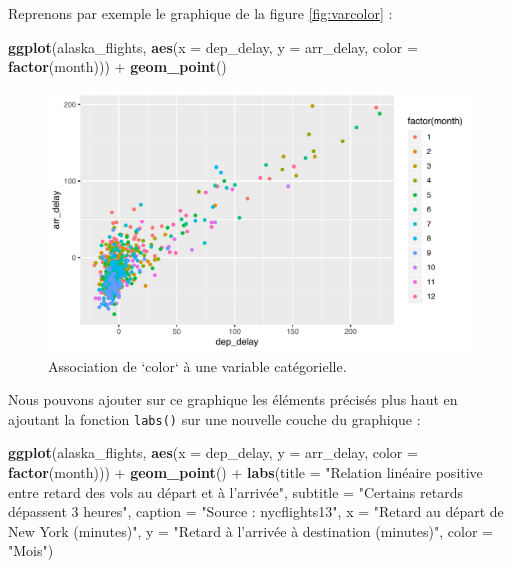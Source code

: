 \documentclass[
  a4paper,
]{article}
\newenvironment{Shaded}{\begin{snugshade}}{\end{snugshade}}
\newcommand{\DataTypeTok}[1]{\textcolor[rgb]{0.00,0.34,0.68}{#1}}
\newcommand{\KeywordTok}[1]{\textcolor[rgb]{0.12,0.11,0.11}{\textbf{#1}}}
\newcommand{\NormalTok}[1]{\textcolor[rgb]{0.12,0.11,0.11}{#1}}
\newcommand{\OperatorTok}[1]{\textcolor[rgb]{0.12,0.11,0.11}{#1}}
\newcommand{\StringTok}[1]{\textcolor[rgb]{0.75,0.01,0.01}{#1}}
\begin{document}
Reprenons par exemple le graphique de la figure \ref{fig:varcolor} :

\begin{Shaded}
\begin{Highlighting}[]
\KeywordTok{ggplot}\NormalTok{(alaska_flights, }
       \KeywordTok{aes}\NormalTok{(}\DataTypeTok{x =}\NormalTok{ dep_delay, }\DataTypeTok{y =}\NormalTok{ arr_delay, }\DataTypeTok{color =} \KeywordTok{factor}\NormalTok{(month))) }\OperatorTok{+}
\StringTok{  }\KeywordTok{geom_point}\NormalTok{()}
\end{Highlighting}
\end{Shaded}

\begin{figure}[htpb]

{\centering \includegraphics[width=0.9\linewidth]{figure/varcolorlabel-1} 

}

\caption{Association de `color` à une variable catégorielle.}\label{fig:varcolorlabel}
\end{figure}

Nous pouvons ajouter sur ce graphique les éléments précisés plus haut en ajoutant la fonction \texttt{labs()} sur une nouvelle couche du graphique :

\begin{Shaded}
\begin{Highlighting}[]
\KeywordTok{ggplot}\NormalTok{(alaska_flights, }
       \KeywordTok{aes}\NormalTok{(}\DataTypeTok{x =}\NormalTok{ dep_delay, }\DataTypeTok{y =}\NormalTok{ arr_delay, }\DataTypeTok{color =} \KeywordTok{factor}\NormalTok{(month))) }\OperatorTok{+}
\StringTok{  }\KeywordTok{geom_point}\NormalTok{() }\OperatorTok{+}
\StringTok{  }\KeywordTok{labs}\NormalTok{(}\DataTypeTok{title =} \StringTok{"Relation linéaire positive entre retard des vols au départ et à l'arrivée"}\NormalTok{,}
       \DataTypeTok{subtitle =} \StringTok{"Certains retards dépassent 3 heures"}\NormalTok{,}
       \DataTypeTok{caption =} \StringTok{"Source : nycflights13"}\NormalTok{,}
       \DataTypeTok{x =} \StringTok{"Retard au départ de New York (minutes)"}\NormalTok{,}
       \DataTypeTok{y =} \StringTok{"Retard à l'arrivée à destination (minutes)"}\NormalTok{,}
       \DataTypeTok{color =} \StringTok{"Mois"}\NormalTok{)}
\end{Highlighting}
\end{Shaded}
\end{document}
